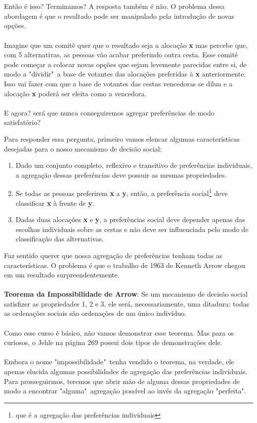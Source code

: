 \documentclass[a4paper,11pt,oneside]{book}
\theoremstyle{definition}
\theoremstyle{break}
\begin{document}
\\~\\
Então é isso? Terminamos? A resposta também é não. O problema dessa abordagem é que o resultado pode ser manipulado pela introdução de novas opções. 
\\~\\
Imagine que um comitê quer que o resultado seja a alocação \textbf{x} mas percebe que, com 5 alternativas, as pessoas vão acabar preferindo outra cesta. Esse comitê pode começar a colocar novas opções que sejam levemente parecidas entre si, de modo a "dividir"\ a base de votantes das alocações preferidas à \textbf{x} anteriormente. Isso vai fazer com que a base de votantes das cestas vencedoras se dilua e a alocação \textbf{x} poderá ser eleita como a vencedora.
\\~\\
E agora? será que nunca conseguiremos agregar preferências de modo satisfatório?

\newpage

Para responder essa pergunta, primeiro vamos elencar algumas características desejadas para o nosso mecanismo de decisão social:
\begin{enumerate}
	\item Dado um conjunto completo, reflexivo e transitivo de preferências individuais, a agregação dessas preferências deve possuir as mesmas propriedades.
	\item Se todas as pessoas preferirem \textbf{x} a \textbf{y}, então, a preferência social\footnote{que é a agregação das preferências individuais} deve classificar \textbf{x} à frente de \textbf{y}.
	\item Dadas duas alocações \textbf{x} e \textbf{y}, a preferências social deve depender apenas das escolhas individuais sobre as cestas e não deve ser influenciada pelo modo de classificação das alternativas.
\end{enumerate}

Faz sentido querer que nossa agregação de preferências tenham todas as características. O problema é que o trabalho de 1963 de Kenneth Arrow chegou em um resultado surpreendentemente.
\\~\\
\textbf{Teorema da Impossibilidade de Arrow}: Se um mecanismo de decisão social satisfizer as propriedades 1, 2 e 3, ele será, necessariamente, uma ditadura: todas as ordenações sociais são ordenações de um único indivíduo.
\\~\\
Como esse curso é básico, não vamos demonstrar esse teorema. Mas para os curiosos, o Jehle na página 269 possui dois tipos de demonstrações dele.
\\~\\
Embora o nome "impossibilidade"\ tenha vendido o teorema, na verdade, ele apenas elucida algumas possibilidades de agregação das preferências individuais. Para prosseguirmos, teremos que abrir mão de alguma dessas propriedades de modo a encontrar "alguma"\ agregação possível ao invés da agregação "perfeita".
\end{document}
